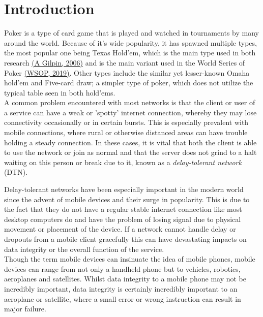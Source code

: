 \documentclass[11pt]{article}
\begin{document}
\tableofcontents



\newpage



\section{Introduction}

Poker is a type of card game that is played and watched in tournaments by many around the world. Because of it's wide popularity, it has spawned multiple types, the most popular one being Texas Hold'em, which is the main type used in both research \hyperlink{research_texas}{(A Gilpin, 2006)} and is the main variant used in the World Series of Poker \hyperlink{wsop_texas}{(WSOP, 2019)}. Other types include the similar yet lesser-known Omaha hold'em and Five-card draw; a simpler type of poker, which does not utilize the typical table seen in both hold'ems. \\

A common problem encountered with most networks is that the client or user of a service can have a weak or 'spotty' internet connection, whereby they may lose connectivity occasionally or in certain bursts. This is especially prevalent with mobile connections, where rural or otherwise distanced areas can have trouble holding a steady connection. In these cases, it is vital that both the client is able to use the network or join as normal and that the server does not grind to a halt waiting on this person or break due to it, known as a \textit{delay-tolerant network} (DTN).

Delay-tolerant networks have been especially important in the modern world since the advent of mobile devices and their surge in popularity. This is due to the fact that they do not have a regular stable internet connection like most desktop computers do and have the problem of losing signal due to physical movement or placement of the device. If a network cannot handle delay or dropouts from a mobile client gracefully this can have devastating impacts on data integrity or the overall function of the service. \\

Though the term mobile devices can insinuate the idea of mobile phones, mobile devices can range from not only a handheld phone but to vehicles, robotics, aeroplanes and satellites. Whilst data integrity to a mobile phone may not be incredibly important, data integrity is certainly incredibly important to an aeroplane or satellite, where a small error or wrong instruction can result in major failure. \\
\end{document}

